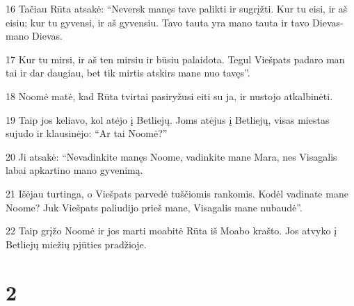 \par 16 Tačiau Rūta atsakė: “Neversk manęs tave palikti ir sugrįžti. Kur tu eisi, ir aš eisiu; kur tu gyvensi, ir aš gyvensiu. Tavo tauta yra mano tauta ir tavo Dievas­mano Dievas. 
\par 17 Kur tu mirsi, ir aš ten mirsiu ir būsiu palaidota. Tegul Viešpats padaro man tai ir dar daugiau, bet tik mirtis atskirs mane nuo tavęs”. 
\par 18 Noomė matė, kad Rūta tvirtai pasiryžusi eiti su ja, ir nustojo atkalbinėti. 
\par 19 Taip jos keliavo, kol atėjo į Betliejų. Joms atėjus į Betliejų, visas miestas sujudo ir klausinėjo: “Ar tai Noomė?” 
\par 20 Ji atsakė: “Nevadinkite manęs Noome, vadinkite mane Mara, nes Visagalis labai apkartino mano gyvenimą. 
\par 21 Išėjau turtinga, o Viešpats parvedė tuščiomis rankomis. Kodėl vadinate mane Noome? Juk Viešpats paliudijo prieš mane, Visagalis mane nubaudė”. 
\par 22 Taip grįžo Noomė ir jos marti moabitė Rūta iš Moabo krašto. Jos atvyko į Betliejų miežių pjūties pradžioje.


\chapter{2}


